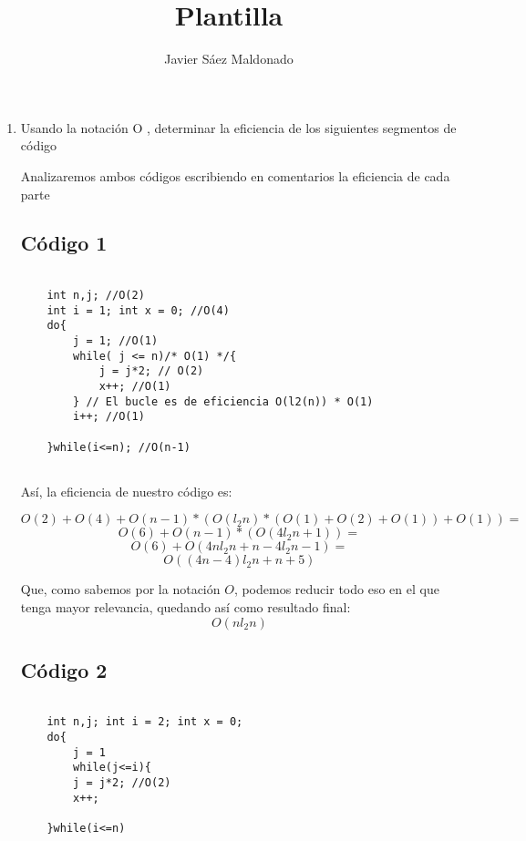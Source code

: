 \documentclass[11pt]{article}
\title{\textbf{Plantilla}}
\author{Javier Sáez Maldonado}
\date{}
\begin{document}
\maketitle

\begin{enumerate}
\item  Usando la notación O
, determinar la eficiencia de los siguientes segmentos de
código

Analizaremos ambos códigos escribiendo en comentarios la eficiencia de cada parte

\subsection*{Código 1}

\begin{verbatim}

	int n,j; //O(2)
	int i = 1; int x = 0; //O(4)
	do{
		j = 1; //O(1)
		while( j <= n)/* O(1) */{ 
			j = j*2; // O(2)
			x++; //O(1)
		} // El bucle es de eficiencia O(l2(n)) * O(1) 
		i++; //O(1)
		
	}while(i<=n); //O(n-1)
	
\end{verbatim}


Así, la eficiencia de nuestro código es:

\[
O(2) + O(4) + O(n-1)*(O(l_2n)*(O(1)+O(2)+O(1))+O(1)) = 
\]
\[
O(6) + O(n-1)*(O(4l_2n + 1)) = 
\]
\[
O(6) + O(4nl_2n + n - 4l_2n - 1 ) = 
\]
\[
O((4n - 4)l_2n + n + 5)
\]

Que, como sabemos por la notación $O$, podemos reducir todo eso en el que tenga mayor relevancia, quedando así como resultado final: 
\[O(nl_2n)\]
\subsection*{Código 2}

\begin{verbatim}
	
	int n,j; int i = 2; int x = 0;
	do{
		j = 1
		while(j<=i){
		j = j*2; //O(2) 
		x++;
		
	}while(i<=n)
\end{verbatim}

	
\end{enumerate}
\end{document}

